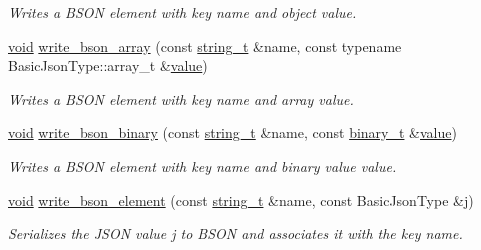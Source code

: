 \begin{DoxyCompactItemize}
\begin{DoxyCompactList}\small\item\em Writes a B\+S\+ON element with key {\itshape name} and object {\itshape value}. \end{DoxyCompactList}\item 
\hyperlink{namespacenlohmann_1_1detail_a59fca69799f6b9e366710cb9043aa77d}{void} \hyperlink{classnlohmann_1_1detail_1_1binary__writer_a025212bd170253638b9f05b3b6aa5bf9}{write\+\_\+bson\+\_\+array} (const \hyperlink{classnlohmann_1_1detail_1_1binary__writer_a29f2ae7a5c4a8c1dae47b3b2310de8a8}{string\+\_\+t} \&name, const typename Basic\+Json\+Type\+::array\+\_\+t \&\hyperlink{namespacenlohmann_1_1detail_a2fb6dae6578e06ae73ca0d7cc8512b1aa2063c1608d6e0baf80249c42e2be5804}{value})
\begin{DoxyCompactList}\small\item\em Writes a B\+S\+ON element with key {\itshape name} and array {\itshape value}. \end{DoxyCompactList}\item 
\hyperlink{namespacenlohmann_1_1detail_a59fca69799f6b9e366710cb9043aa77d}{void} \hyperlink{classnlohmann_1_1detail_1_1binary__writer_a97d34d9a70ddc06ae782c55454df42bc}{write\+\_\+bson\+\_\+binary} (const \hyperlink{classnlohmann_1_1detail_1_1binary__writer_a29f2ae7a5c4a8c1dae47b3b2310de8a8}{string\+\_\+t} \&name, const \hyperlink{classnlohmann_1_1detail_1_1binary__writer_a3169b4f7abb773ea30348770629c53e8}{binary\+\_\+t} \&\hyperlink{namespacenlohmann_1_1detail_a2fb6dae6578e06ae73ca0d7cc8512b1aa2063c1608d6e0baf80249c42e2be5804}{value})
\begin{DoxyCompactList}\small\item\em Writes a B\+S\+ON element with key {\itshape name} and binary value {\itshape value}. \end{DoxyCompactList}\item 
\hyperlink{namespacenlohmann_1_1detail_a59fca69799f6b9e366710cb9043aa77d}{void} \hyperlink{classnlohmann_1_1detail_1_1binary__writer_a7ff58bf1a80018148bed860667ffca07}{write\+\_\+bson\+\_\+element} (const \hyperlink{classnlohmann_1_1detail_1_1binary__writer_a29f2ae7a5c4a8c1dae47b3b2310de8a8}{string\+\_\+t} \&name, const Basic\+Json\+Type \&j)
\begin{DoxyCompactList}\small\item\em Serializes the J\+S\+ON value {\itshape j} to B\+S\+ON and associates it with the key {\itshape name}. \end{DoxyCompactList}\item 

\end{DoxyCompactItemize}
